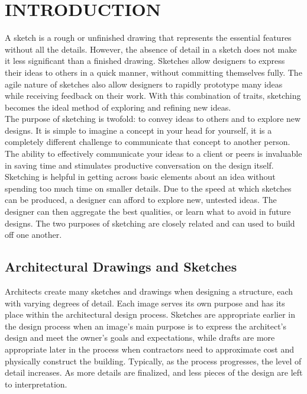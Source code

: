 
\chapter{INTRODUCTION} \label{sec:introduction}

A sketch is a rough or unfinished drawing that represents the essential features without all the details. However, the absence of detail in a sketch does not make it less significant than a finished drawing. Sketches allow designers to express their ideas to others in a quick manner, without committing themselves fully. The agile nature of sketches also allow designers to rapidly prototype many ideas while receiving feedback on their work. With this combination of traits, sketching becomes the ideal method of exploring and refining new ideas. \\

The purpose of sketching is twofold: to convey ideas to others and to explore new designs. It is simple to imagine a concept in your head for yourself, it is a completely different challenge to communicate that concept to another person. The ability to effectively communicate your ideas to a client or peers is invaluable in saving time and stimulates productive conversation on the design itself. Sketching is helpful in getting across basic elements about an idea without spending too much time on smaller details. Due to the speed at which sketches can be produced, a designer can afford to explore new, untested ideas. The designer can then aggregate the best qualities, or learn what to avoid in future designs. The two purposes of sketching are closely related and can used to build off one another.

\section{Architectural Drawings and Sketches}
Architects create many sketches and drawings when designing a structure, each with varying degrees of detail. Each image serves its own purpose and has its place within the architectural design process. Sketches are appropriate earlier in the design process when an image's main purpose is to express the architect's design and meet the owner's goals and expectations, while drafts are more appropriate later in the process when contractors need to approximate cost and physically construct the building. Typically, as the process progresses, the level of detail increases. As more details are finalized, and less pieces of the design are left to interpretation.

